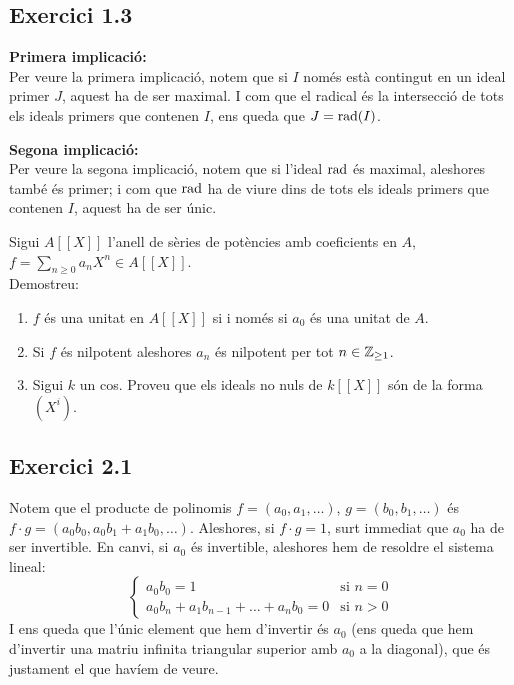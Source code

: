 \documentclass[11pt, a4paper]{article}
\begin{document}
\subsection{Exercici 1.3}
\textbf{Primera implicació:}\\
Per veure la primera implicació, notem que si $I$ només està contingut en un ideal primer $J$, aquest ha de ser maximal. I com que el radical és la intersecció de tots els ideals primers que contenen $I$, ens queda que $J=\operatorname*{rad}(I)$.\par
\textbf{Segona implicació:}\\
Per veure la segona implicació, notem que si l'ideal $\operatorname*{rad}$ és maximal, aleshores també és primer; i com que $\operatorname*{rad}$ ha de viure dins de tots els ideals primers que contenen $I$, aquest ha de ser únic.
\newpage
\begin{tcolorbox}[title=\section{Exercici 2}]
    Sigui $A[[X]]$ l'anell de sèries de potències amb coeficients en $A$, $f=\sum_{n\geq0}a_nX^n\in A[[X]]$.\\
    Demostreu:
    \begin{enumerate}
        \item $f$ és una unitat en $A[[X]]$ si i només si $a_0$ és una unitat de $A$.
        \item Si $f$ és nilpotent aleshores $a_n$ és nilpotent per tot $n\in\mathbb Z_{\geq 1}$.
        \item Sigui $k$ un cos. Proveu que els ideals no nuls de $k[[X]]$ són de la forma $(X^i)$.
    \end{enumerate}
\end{tcolorbox}
\subsection{Exercici 2.1}
Notem que el producte de polinomis $f=(a_0, a_1, \dots)$, $g=(b_0, b_1, \dots)$ és $f\cdot g=(a_0b_0, a_0b_1+a_1b_0,\dots)$. Aleshores, si $f\cdot g=1$, surt immediat que $a_0$ ha de ser invertible. En canvi, si $a_0$ és invertible, aleshores hem de resoldre el sistema lineal:
\[
    \begin{cases}
        a_0b_0=1&\text{si } n=0\\
        a_0b_n+a_1b_{n-1}+\dots+a_n b_0=0 &\text{si }n>0
    \end{cases}
\]
I ens queda que l'únic element que hem d'invertir és $a_0$ (ens queda que hem d'invertir una matriu infinita triangular superior amb $a_0$ a la diagonal), que és justament el que havíem de veure.
\end{document}
